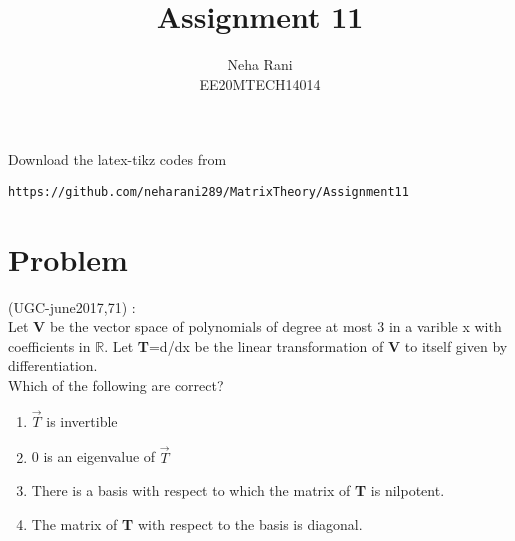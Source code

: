 \documentclass[journal,12pt]{IEEEtran}
\begin{document}
     \def\rightbox#1{\makebox[0in][r]{#1}}
     \def\centbox#1{\makebox[0in]{#1}}
     \def\topbox#1{\raisebox{-\baselineskip}[0in][0in]{#1}}
     \def\midbox#1{\raisebox{-0.5\baselineskip}[0in][0in]{#1}}
\vspace{3cm}
\title{Assignment 11}
\author{Neha Rani\\EE20MTECH14014}
\maketitle
\bigskip
\renewcommand{\thefigure}{\theenumi}
\renewcommand{\thetable}{\theenumi}
%
Download the latex-tikz codes from 
%
\begin{lstlisting}
https://github.com/neharani289/MatrixTheory/Assignment11
\end{lstlisting}
\section{\textbf{Problem}}
(UGC-june2017,71) : \\
%
Let \textbf{V} be the vector space of polynomials of degree at most 3 in a varible x with coefficients in $\mathbb{R}$. Let \textbf{T}=d/dx be the linear transformation of \textbf{V} to itself given by differentiation.\\

Which of the following are correct?\\
\begin{enumerate}
\item $\vec{T}$ is invertible
\item 0 is an eigenvalue of $\vec{T}$
\item There is a basis with respect to which the matrix of \textbf{T} is nilpotent.
\item The matrix of \textbf{T} with respect to the basis  is diagonal.
\end{enumerate}
\end{document}
